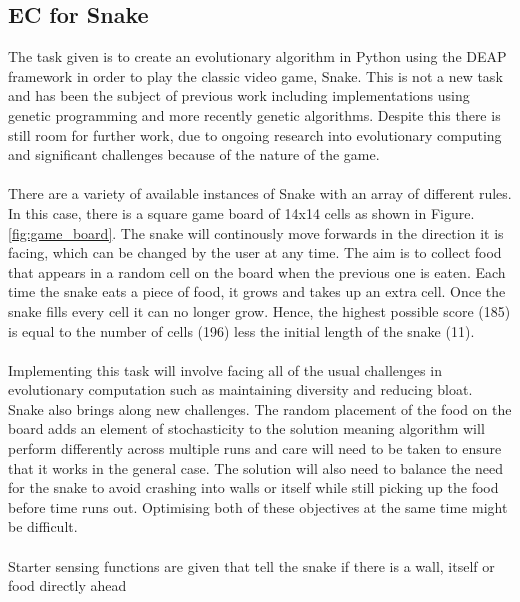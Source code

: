 \documentclass{article}
\begin{document}
\subsection{EC for Snake}
The task given is to create an evolutionary algorithm in Python using the DEAP framework in order to play the classic video game, Snake. This is not a new task and has been the subject of previous work including implementations using genetic programming\cite{snake_blog} and more recently genetic algorithms\cite{snake_paper}. Despite this there is still room for further work, due to ongoing research into evolutionary computing and significant challenges because of the nature of the game.
\\\\
There are a variety of available instances of Snake with an array of different rules. In this case, there is a square game board of 14x14 cells as shown in Figure. \ref{fig:game_board}. The snake will continously move forwards in the direction it is facing, which can be changed by the user at any time. The aim is to collect food that appears in a random cell on the board when the previous one is eaten. Each time the snake eats a piece of food, it grows and takes up an extra cell. Once the snake fills every cell it can no longer grow. Hence, the highest possible score (185) is equal to the number of cells (196) less the initial length of the snake (11).
\\\\
Implementing this task will involve facing all of the usual challenges in evolutionary computation such as maintaining diversity and reducing bloat. Snake also brings along new challenges. The random placement of the food on the board adds an element of stochasticity to the solution meaning algorithm will perform differently across multiple runs and care will need to be taken to ensure that it works in the general case. The solution will also need to balance the need for the snake to avoid crashing into walls or itself while still picking up the food before time runs out. Optimising both of these objectives at the same time might be difficult.
\\\\
Starter sensing functions are given that tell the snake if there is a wall, itself or food directly ahead
\end{document}
